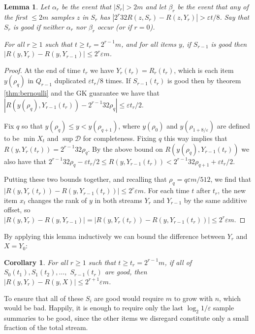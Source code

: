 \documentclass{article}
\theoremstyle{plain}
\newtheorem{lemma}[theorem]{Lemma}
\newtheorem{corollary}[theorem]{Corollary}
\def\ep{\varepsilon}
\def\DD{\mathcal{D}}
\def\pl{\!+\!}
\newcommand{\p}[1]{(#1)}
\newcommand{\abs}[1]{|#1|}
\newcommand{\rank}[2]{R\p{#1,#2}}
\newcommand{\eva}[1]{\alpha_{#1}}
\newcommand{\evb}[1]{\beta_{#1}}
\begin{document}
\begin{lemma}
  \label{lem:online-error-indstep}
  Let $\eva{r}$ be the event that $\abs{S_r} > 2 m$ and let $\evb{r}$ be the
  event that any of the first $\le 2 m$ samples $z$ in $S_r$ has $\abs{2^r 32
    \rank{z}{S_r} - \rank{z}{Y_r}} > \ep t / 8$. Say that $S_r$ is \emph{good}
  if neither $\eva{r}$ nor $\evb{r}$ occur (or if $r = 0$).

  For all $r \ge 1$ such that $t \ge t_r = 2^{r-1} m$, and for all items $y$, if
  $S_{r-1}$ is good then $\abs{\rank{y}{Y_r} - \rank{y}{Y_{r-1}}} \le 2^r \ep
  m$.
\end{lemma}
\begin{proof}
  At the end of time $t_r$ we have $Y_r\p{t_r} = R_r\p{t_r}$, which is each item
  $y\p{\rho_q}$ in $Q_{r-1}$ duplicated $\ep t_r / 8$ times. If $S_{r-1}\p{t_r}$
  is good then by theorem \ref{thm:bernoulli} and the GK guarantee we have that
  $\abs{\rank{y\p{\rho_q}}{Y_{r-1}\p{t_r}} - 2^{r-1} 32 \rho_q} \le \ep t_r / 2$.

  Fix $q$ so that $y\p{\rho_q} \le y < y\p{\rho_{q+1}}$, where $y\p{\rho_0}$ and
  $y\p{\rho_{1 \pl 8/\ep}}$ are defined to be $\min X_t$ and $\sup \DD$ for
  completeness. Fixing $q$ this way implies that $\rank{y}{Y_r\p{t_r}} = 2^{r-1}
  32 \rho_q$. By the above bound on $\rank{y\p{\rho_q}}{Y_{r-1}\p{t_r}}$ we also
  have that $2^{r-1} 32 \rho_q - \ep t_r / 2 \le \rank{y}{Y_{r-1}\p{t_r}} <
  2^{r-1} 32 \rho_{q+1} + \ep t_r / 2$.

  Putting these two bounds together, and recalling that $\rho_q = q \ep m /
  512$, we find that $\abs{\rank{y}{Y_r\p{t_r}} - \rank{y}{Y_{r-1}\p{t_r}}} \le
  2^r \ep m$. For each time $t$ after $t_r$, the new item $x_t$ changes the rank
  of $y$ in both streams $Y_r$ and $Y_{r-1}$ by the same additive offset, so
  $\abs{\rank{y}{Y_r} - \rank{y}{Y_{r-1}}} = \abs{\rank{y}{Y_r\p{t_r}} -
    \rank{y}{Y_{r-1}\p{t_r}}} \le 2^r \ep m$.
\end{proof}

By applying this lemma inductively we can bound the difference between $Y_r$ and
$X = Y_0$:

\begin{corollary}
  For all $r \ge 1$ such that $t \ge t_r = 2^{r-1} m$, if all of $S_0\p{t_1},
  S_1\p{t_2}, \ldots,$ $S_{r-1}\p{t_r}$ are good, then $\abs{\rank{y}{Y_r} -
    \rank{y}{X}} \le 2^{r+1} \ep m$.
\end{corollary}

To ensure that all of these $S_i$ are good would require $m$ to grow with $n$,
which would be bad. Happily, it is enough to require only the last $\log_2
1/\ep$ sample summaries to be good, since the other items we disregard
constitute only a small fraction of the total stream.
\end{document}
